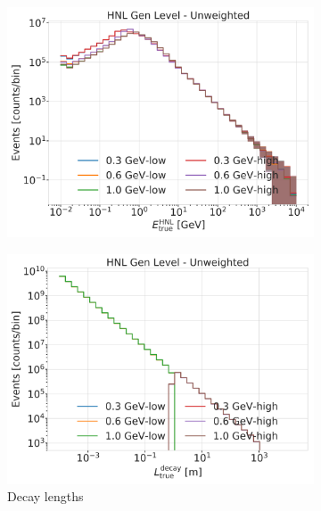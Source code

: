 \begin{figure}[h]
    \centering
    \begin{subfigure}{0.49\linewidth}
        \includegraphics{figures/hnl_simulation/generation/1_d_distr_HNL_true_energy_gen_level_unweighted.png}
    \end{subfigure}
    \begin{subfigure}{0.49\linewidth}
        \includegraphics{figures/hnl_simulation/generation/1_d_distr_distance_gen_level_unweighted.png}
        \caption{Decay lengths}
    \end{subfigure}
    \begin{subfigure}{0.49\linewidth}

\end{subfigure}
\end{figure}
